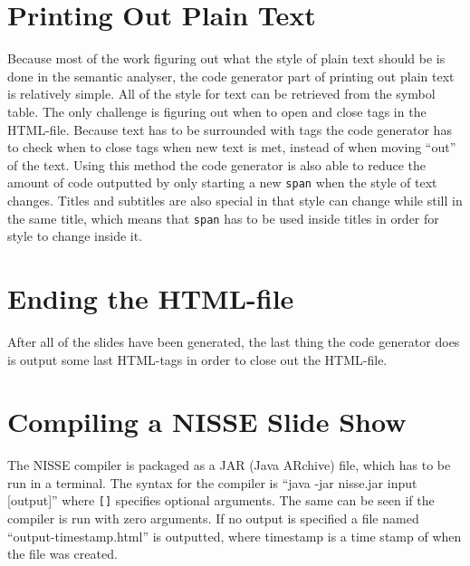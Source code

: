 \section{Printing Out Plain Text}
Because most of the work figuring out what the style of plain text should be is done in the semantic analyser, the code generator part of printing out plain text is relatively simple. All of the style for text can be retrieved from the symbol table. The only challenge is figuring out when to open and close tags in the HTML-file. Because text has to be surrounded with tags the code generator has to check when to close tags when new text is met, instead of when moving ``out'' of the text. Using this method the code generator is also able to reduce the amount of code outputted by only starting a new \texttt{span} when the style of text changes. Titles and subtitles are also special in that style can change while still in the same title, which means that \texttt{span} has to be used inside titles in order for style to change inside it.

\section{Ending the HTML-file}
After all of the slides have been generated, the last thing the code generator does is output some last HTML-tags in order to close out the HTML-file.

\section{Compiling a NISSE Slide Show}
The NISSE compiler is packaged as a JAR (Java ARchive) file, which has to be run in a terminal. The syntax for the compiler is ``java -jar nisse.jar input [output]'' where \texttt{[]} specifies optional arguments. The same can be seen if the compiler is run with zero arguments. If no output is specified a file named ``output-timestamp.html'' is outputted, where timestamp is a time stamp of when the file was created.